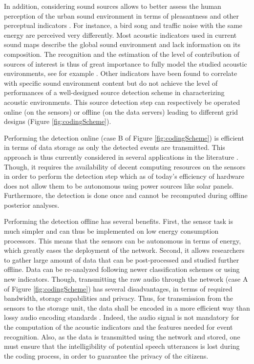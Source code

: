\documentclass[sensors,article,submit,moreauthors,pdftex,10pt,a4paper]{mdpi}
\begin{document}
In addition, considering sound sources allows to better assess the human perception of the urban sound environment in terms of pleasantness and other perceptual indicators \cite{lavandier2006contribution, aumond2017modeling}. For instance, a bird song and traffic noise with the same energy are perceived very differently. Most acoustic indicators used in current sound maps describe the global sound environment and lack information on its composition. The recognition and the estimation of the level of contribution of sources of interest is thus of great importance to fully model the studied acoustic environments, see for example \cite{alsina2016design, app7020146, gloaguen2016estimating}. Other indicators have been found to correlate with specific sound environment content \cite{aumond2017} but do not achieve the level of performances of a well-designed source detection scheme in characterizing acoustic environments. This source detection step can respectively be operated online (on the sensors) or offline (on the data servers) leading to different grid designs (Figure \ref{fig:codingScheme}).

Performing the detection online (case B of Figure \ref{fig:codingScheme}) is efficient in terms of data storage as only the detected events are transmitted. This approach is thus currently considered in several applications in the literature \cite{defreville2006automatic, mydlarz2017implementation, mydlarz2015design}. Though, it requires the availability of decent computing resources on the sensors in order to perform the detection step which as of today's efficiency of hardware does not allow them to be autonomous using power sources like solar panels. Furthermore, the detection is done once and cannot be recomputed during offline posterior analyses.

Performing the detection offline has several benefits. First, the sensor task is much simpler and can thus be implemented on low energy consumption processors. This means that the sensors can be autonomous in terms of energy, which greatly eases the deployment of the network. Second, it allows researchers to gather large amount of data that can be post-processed and studied further offline. Data can be re-analyzed following newer classification schemes or using new indicators. Though, transmitting the raw audio  through the network (case A of Figure \ref{fig:codingScheme}) has several disadvantages, in terms of required bandwidth, storage capabilities and privacy. Thus, for transmission from the sensors to the storage unit, the data shall be encoded in a more efficient way than lossy audio encoding standards \cite{pan1995tutorial}. Indeed, the audio signal is not mandatory for the computation of the acoustic indicators and the features needed for event recognition. Also, as the data is transmitted using the network and stored, one must ensure that the intelligibility of potential speech utterances is lost during the coding process, in order to guarantee the privacy of the citizens.
\end{document}
